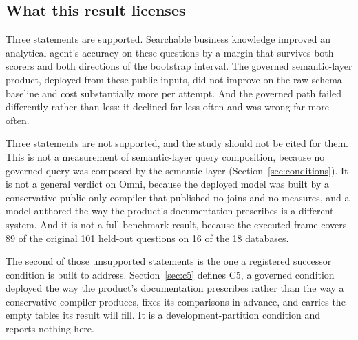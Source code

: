\subsection{What this result licenses}

Three statements are supported. Searchable business knowledge improved an
analytical agent's accuracy on these questions by a margin that survives both
scorers and both directions of the bootstrap interval. The governed
semantic-layer product, deployed from these public inputs, did not improve on the
raw-schema baseline and cost substantially more per attempt. And the governed
path failed differently rather than less: it declined far less often and was
wrong far more often.

Three statements are not supported, and the study should not be cited for them.
This is not a measurement of semantic-layer query composition, because no
governed query was composed by the semantic layer (Section~\ref{sec:conditions}).
It is not a general verdict on Omni, because the deployed model was built by a
conservative public-only compiler that published no joins and no measures, and a
model authored the way the product's documentation prescribes is a different
system. And it is not a full-benchmark result, because the executed frame covers
89 of the original 101 held-out questions on 16 of the 18 databases.

The second of those unsupported statements is the one a registered successor
condition is built to address. Section~\ref{sec:c5} defines C5, a governed
condition deployed the way the product's documentation prescribes rather than the
way a conservative compiler produces, fixes its comparisons in advance, and
carries the empty tables its result will fill. It is a development-partition
condition and reports nothing here.
